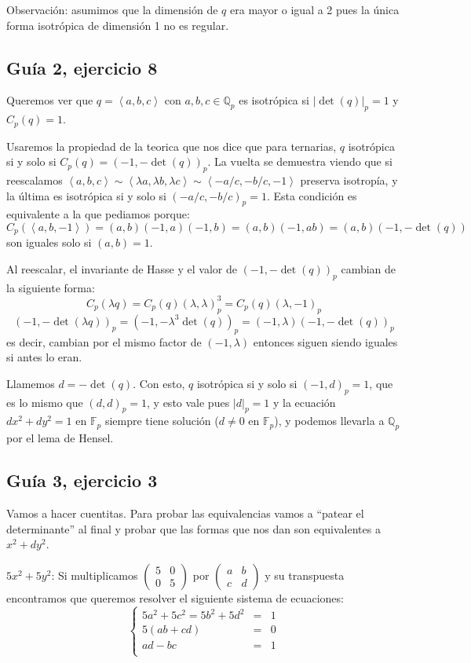 \documentclass[12pt]{amsart}
\newcommand{\QQ}{\mathbb{Q}}
\newcommand{\FF}{\mathbb{F}}
\newcommand{\minimat}[4]{\left(\begin{smallmatrix} #1 & #2 \\ #3 & #4 
\end{smallmatrix}\right)}
\newcommand{\lc}{\left<}
\newcommand{\rc}{\right>}
\theoremstyle{plain}
\begin{document}
Observación: asumimos que la dimensión de $q$ era mayor o igual a 2
pues la única forma isotrópica de dimensión 1 no es regular.

\subsection*{Guía 2, ejercicio 8}

Queremos ver que $q = \lc a,b,c\rc $ con $a,b,c \in \QQ_p$ es 
isotrópica si $|\det (q)|_p =1$ y $C_p(q) = 1$.

Usaremos la propiedad de la teorica que nos dice que para ternarias,
$q$ isotrópica si y solo si $C_p(q)=(-1,-\det (q))_p$. La vuelta se 
demuestra viendo que si reescalamos $\lc a,b,c\rc \sim \lc\lambda a,
\lambda b,\lambda c\rc \sim \lc-a/c,-b/c,-1\rc$ preserva isotropía, 
y la última es isotrópica si y solo si $(-a/c,-b/c)_p = 1$. 
Esta condición es equivalente a la que pediamos porque:
$$C_p(\lc a,b,-1\rc) = (a,b)(-1,a)(-1,b)=(a,b)(-1,ab)=(a,b)
(-1,-\det(q))$$ son iguales solo si $(a,b)=1$.

Al reescalar, el invariante de Hasse y el valor de $(-1,-\det(q))_p$ 
cambian de la siguiente forma:
$$C_p(\lambda q) = C_p(q) (\lambda,\lambda)_p^3 = C_p(q) 
(\lambda, -1)_p$$
$$(-1,-\det(\lambda q))_p = (-1,-\lambda^3\det(q))_p=
(-1,\lambda)(-1,-\det(q))_p$$
es decir, cambian por el mismo factor de $(-1,\lambda)$ entonces siguen
siendo iguales si antes lo eran.

Llamemos $d = -\det (q)$. Con esto, $q$ isotrópica si y solo si 
$(-1,d)_p =1$, que es lo mismo que $(d,d)_p =1$, y esto vale
pues $|d|_p =1$ y la ecuación $d x^2 + d y^2 = 1$ en 
$\FF_p$ siempre tiene solución ($d\neq 0$ en $\FF_p$), y
podemos llevarla a $\QQ_p$ por el lema de Hensel.

\subsection*{Guía 3, ejercicio 3} Vamos a hacer cuentitas. Para
probar las equivalencias vamos a ``patear el determinante'' al final
y probar que las formas que nos dan son equivalentes a $x^2+dy^2$.

$5x^2+5y^2$: Si multiplicamos $\minimat{5}{0}{0}{5}$ por 
$\minimat{a}{b}{c}{d}$ y su transpuesta encontramos que queremos 
resolver el siguiente sistema de ecuaciones:
$$\left\{
\begin{matrix}
    5a^2+5c^2=5b^2+5d^2 &=&1 \\
    5(ab+cd) &=&0 \\
    ad-bc &=&1 \\
\end{matrix}\right.$$
\end{document}
